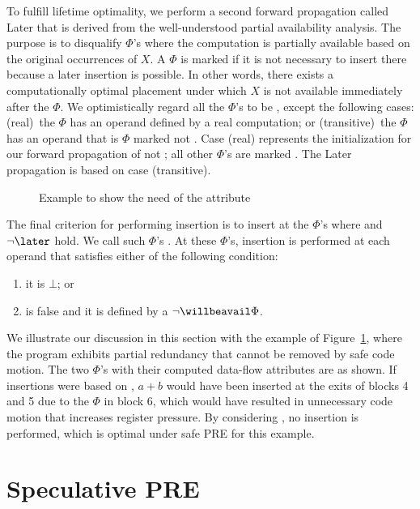 To fulfill lifetime optimality, we perform a second forward propagation called Later that is derived from the well-understood partial availability analysis. 
The purpose is to disqualify \canbeavail $\Phi$'s where the computation is partially available based on the original occurrences of $X$. 
A $\Phi$ is marked \later if it is not necessary to insert there because a later insertion is possible. 
In other words, there exists a computationally optimal placement under which $X$ is not available immediately after the $\Phi$. 
We optimistically regard all the \canbeavail $\Phi$'s to be \later, except the following cases: 
(real)~the $\Phi$ has an operand defined by a real computation; 
or (transitive)~the $\Phi$ has an operand that is \canbeavail $\Phi$ marked not \later. 
Case (real) represents the initialization for our forward propagation of not \later; 
all other \canbeavail $\Phi$'s are marked \later. 
The Later propagation is based on case (transitive).

\begin{figure}
\centering
\caption{Example to show the need of the \later attribute}
\label{fig:later-example}
\end{figure}

The final criterion for performing insertion is to insert at the $\Phi$'s where 
\canbeavail and $\neg\later$ hold.  We call such $\Phi$'s
\willbeavail.  At these $\Phi$'s,
insertion is performed at each operand that satisfies either of the following
condition:
\begin{enumerate}
\item it is $\bot$; or
\item \hasrealuse is false and it is defined by a 
$\neg \willbeavail \Phi$.
\end{enumerate}

We illustrate our discussion in this section with the example of Figure~\ref{fig:later-example}, where the program exhibits partial redundancy that cannot be removed by safe code motion. 
The two $\Phi$'s with their computed data-flow attributes are as shown. 
If insertions were based on \canbeavail, $a+b$ would have been inserted at the exits of blocks 4 and 5 due to the $\Phi$ in block 6, which would have resulted in unnecessary code motion that increases register pressure. 
By considering \later, no insertion is performed, which is optimal under safe PRE for this example.
 
\section{Speculative PRE}

